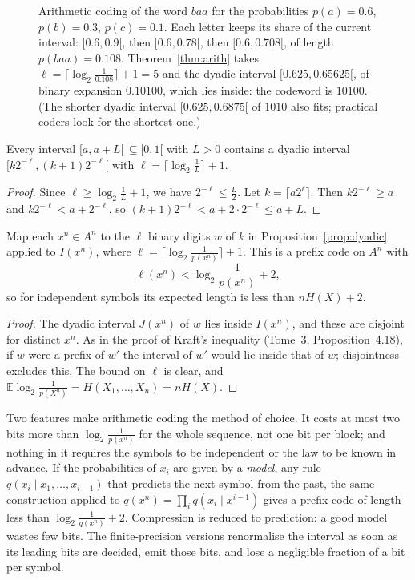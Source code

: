 \begin{figure}[ht]
\centering
{}
\caption{Arithmetic coding of the word $baa$ for the probabilities $p(a)=0.6$, $p(b)=0.3$, $p(c)=0.1$. Each letter keeps its share of the current interval: $[0.6,0.9[$, then $[0.6,0.78[$, then $[0.6,0.708[$, of length $p(baa)=0.108$. Theorem~\ref{thm:arith} takes $\ell=\lceil\log_2\frac1{0.108}\rceil+1=5$ and the dyadic interval $[0.625,0.65625[$, of binary expansion $0.10100$, which lies inside: the codeword is $10100$. (The shorter dyadic interval $[0.625,0.6875[$ of $1010$ also fits; practical coders look for the shortest one.)}
\label{fig:arith}
\end{figure}

\begin{proposition}\label{prop:dyadic}
Every interval $[a,a+L[\,\subseteq[0,1[$ with $L>0$ contains a dyadic interval $[k2^{-\ell},(k+1)2^{-\ell}[$ with $\ell=\lceil\log_2\frac1L\rceil+1$.
\end{proposition}

\begin{proof}
Since $\ell\ge\log_2\frac1L+1$, we have $2^{-\ell}\le\frac L2$. Let $k=\lceil a2^\ell\rceil$. Then $k2^{-\ell}\ge a$ and $k2^{-\ell}<a+2^{-\ell}$, so $(k+1)2^{-\ell}<a+2\cdot2^{-\ell}\le a+L$.
\end{proof}

\begin{theorem}\label{thm:arith}
Map each $x^n\in A^n$ to the $\ell$ binary digits $w$ of $k$ in Proposition~\ref{prop:dyadic} applied to $I(x^n)$, where $\ell=\lceil\log_2\frac1{p(x^n)}\rceil+1$. This is a prefix code on $A^n$ with
\[
\ell(x^n)<\log_2\frac1{p(x^n)}+2,
\]
so for independent symbols its expected length is less than $nH(X)+2$.
\end{theorem}

\begin{proof}
The dyadic interval $J(x^n)$ of $w$ lies inside $I(x^n)$, and these are disjoint for distinct $x^n$. As in the proof of Kraft's inequality (Tome~3, Proposition~4.18), if $w$ were a prefix of $w'$ the interval of $w'$ would lie inside that of $w$; disjointness excludes this. The bound on $\ell$ is clear, and $\mathbb E\log_2\frac1{p(X^n)}=H(X_1,\dots,X_n)=nH(X)$.
\end{proof}

Two features make arithmetic coding the method of choice. It costs at most two bits more than $\log_2\frac1{p(x^n)}$ for the whole sequence, not one bit per block; and nothing in it requires the symbols to be independent or the law to be known in advance. If the probabilities of $x_i$ are given by a \emph{model}, any rule $q(x_i\mid x_1,\dots,x_{i-1})$ that predicts the next symbol from the past, the same construction applied to $q(x^n)=\prod_iq(x_i\mid x^{i-1})$ gives a prefix code of length less than $\log_2\frac1{q(x^n)}+2$. Compression is reduced to prediction: a good model wastes few bits. The finite-precision versions renormalise the interval as soon as its leading bits are decided, emit those bits, and lose a negligible fraction of a bit per symbol.

